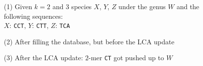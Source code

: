 \documentclass[pdflatex,sn-vancouver-num]{sn-jnl}
\begin{document}
\begin{figure}[!htbp]%
\centering
\small
\begin{minipage}[c]{0.25\textwidth}
\begin{flushleft}(1) Given $k = 2$ and 3 species $X$, $Y$, $Z$ under the genus $W$ and the following sequences:\\
$X$: \texttt{CCT}, $Y$: \texttt{CTT}, $Z$: \texttt{TCA}
\end{flushleft}
\end{minipage}
\begin{minipage}[c]{0.2\textwidth}
\end{minipage}
\begin{minipage}[c]{0.25\textwidth}
\begin{flushleft}(2) After filling the database, but before the LCA update\end{flushleft}
\end{minipage}
\begin{minipage}[c]{0.2\textwidth}
\end{minipage}
\begin{minipage}[c]{0.25\textwidth}
\begin{flushleft}(3) After the LCA update: $2$-mer \texttt{CT} got pushed up to $W$
\end{flushleft}
\end{minipage}
\begin{minipage}[c]{0.2\textwidth}
\end{minipage}
\begin{minipage}[c]{0.25\textwidth}

\end{minipage}
\end{figure}
\end{document}
